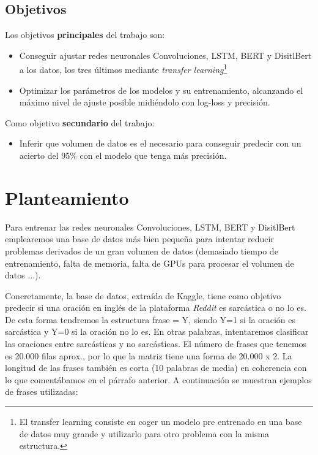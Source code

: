 \documentclass[10pt,riqno,a4paper,twoside]{article}\usepackage[]{graphicx}\usepackage[]{color}
\begin{document}
\subsection{Objetivos}

Los objetivos \textbf{principales} del trabajo son:\\ 

\begin{itemize}

\item{Conseguir ajustar redes neuronales Convoluciones, LSTM, BERT y DisitlBert a los datos, los tres \'{u}ltimos mediante \textit{transfer learning}\footnote{El transfer learning consiste en coger un modelo pre entrenado en una base de datos muy grande y utilizarlo para otro problema con la misma estructura.}}


\item{Optimizar los par\'{a}metros de los modelos y su entrenamiento, alcanzando el m\'{a}ximo nivel de ajuste posible midi\'{e}ndolo con log-loss y precisión.}

\end{itemize}

Como objetivo \textbf{secundario} del trabajo:

\begin{itemize}
\item{Inferir que volumen de datos es el necesario para conseguir predecir con un acierto del 95\% con el modelo que tenga m\'{a}s precisi\'{o}n.}
\end{itemize}


\clearpage

\section{Planteamiento}

Para entrenar las redes neuronales Convoluciones, LSTM, BERT y DisitlBert emplearemos una base de datos m\'{a}s bien pequeña para intentar reducir problemas derivados de un gran volumen de datos (demasiado tiempo de entrenamiento, falta de memoria, falta de GPUs para procesar el volumen de datos ...). 

Concretamente, la base de datos, extraída de Kaggle, tiene como objetivo predecir si una oraci\'{o}n en ingl\'{e}s de la plataforma \textit{Reddit} es sarc\'{a}stica o no lo es. De esta forma tendremos la estructura frase = Y, siendo Y=1 si la oraci\'{o}n es sarc\'{a}stica y Y=0 si la oraci\'{o}n no lo es. En otras palabras, intentaremos clasificar las oraciones entre sarcásticas y no sarcásticas. El n\'{u}mero de frases que tenemos es 20.000 filas aprox., por lo que la matriz tiene una forma de 20.000 x 2. La longitud de las frases tambi\'{e}n es corta (10 palabras de media) en coherencia con lo que coment\'{a}bamos en el p\'{a}rrafo anterior. A continuación se muestran ejemplos de frases utilizadas:
\end{document}
